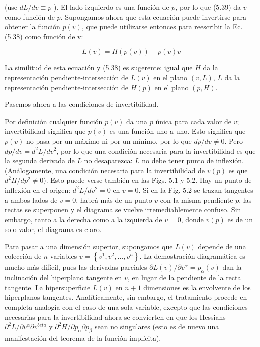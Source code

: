     (use $d L / d v \equiv p$ ). El lado izquierdo es una función de $p$, por lo que (5.39) da $v$ como función de $p$. Supongamos ahora que esta ecuación puede invertirse para obtener la función $p(v)$, que puede utilizarse entonces para reescribir la Ec. (5.38) como función de v:

    \begin{equation*}
      L(v)=H(p(v))-p(v) v \tag{5.40}
      \end{equation*}

      La similitud de esta ecuación y (5.38) es sugerente: igual que $H$ da la representación pendiente-intersección de $L(v)$ en el plano $(v, L)$, $L$ da la representación pendiente-intersección de $H(p)$ en el plano $(p, H)$.


  Pasemos ahora a las condiciones de invertibilidad.


\begin{lemma}[Invertibilidad]
   Por definición cualquier función $p(v)$ da una $p$ única para cada valor de $v$; invertibilidad significa que $p(v)$ es una función uno a uno. Esto significa que $p(v)$ no pasa por un máximo ni por un mínimo, por lo que $d p / d v \neq 0$. Pero $d p / d v=d^{2} L / d v^{2}$, por lo que una condición necesaria para la invertibilidad es que la segunda derivada de $L$ no desaparezca: $L$ no debe tener punto de inflexión. (Análogamente, una condición necesaria para la invertibilidad de $v(p)$ es que $d^{2} H / d p^{2} \neq 0$). Esto puede verse también en las Figs. 5.1 y 5.2. Hay un punto de inflexión en el origen: $d^{2} L / d v^{2}=0$ en $v=0$. Si en la Fig. 5.2 se trazan tangentes a ambos lados de $v=0$, habrá más de un punto $v$ con la misma pendiente $p$, las rectas se superponen y el diagrama se vuelve irremediablemente confuso. Sin embargo, tanto a la derecha como a la izquierda de $v=0$, donde $v(p)$ es de un solo valor, el diagrama es claro.

   Para pasar a una dimensión superior, supongamos que $L(v)$ depende de una colección de $n$ variables $v=\left\{v^{1}, v^{2}, \ldots, v^{n}\right\}$. La demostración diagramática es mucho más difícil, pues las derivadas parciales $\partial L(v) / \partial v^{\alpha}=p_{\alpha}(v)$ dan la inclinación del hiperplano tangente en $v$, en lugar de la pendiente de la recta tangente. La hipersuperficie $L(v)$ en $n+1$ dimensiones es la envolvente de los hiperplanos tangentes. Analíticamente, sin embargo, el tratamiento procede en completa analogía con el caso de una sola variable, excepto que las condiciones necesarias para la invertibilidad ahora se convierten en que los Hessians $\partial^{2} L / \partial v^{\alpha} \partial v^{beta}$ y $\partial^{2} H / \partial p_{\alpha} \partial p_{\beta}$ sean no singulares (esto es de nuevo una manifestación del teorema de la función implícita).
\end{lemma}